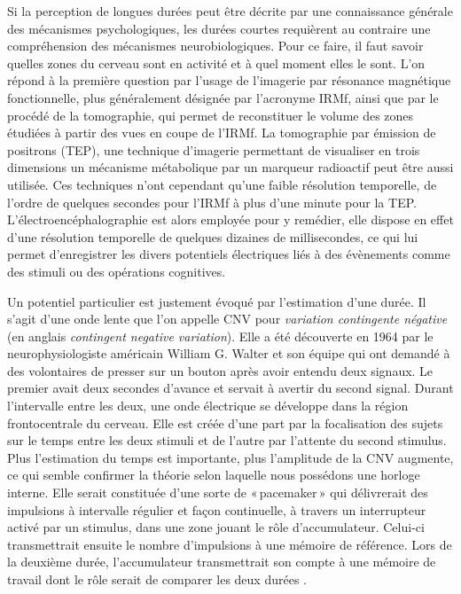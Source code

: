 \documentclass[12pt,fleqn,oneside,french,openany]{book} %
\begin{document}
Si la perception de longues durées peut être décrite par une connaissance générale des mécanismes psychologiques, les durées courtes requièrent au contraire une compréhension des mécanismes neurobiologiques. Pour ce faire, il faut savoir quelles zones du cerveau sont en activité et à quel moment elles le sont. L'on répond à la première question par l'usage de l'imagerie par résonance magnétique fonctionnelle, plus généralement désignée par l'acronyme IRMf, ainsi que par le procédé de la tomographie, qui permet de reconstituer le volume des zones étudiées à partir des vues en coupe de l'IRMf. La tomographie par émission de positrons (TEP), une technique d'imagerie permettant de visualiser en trois dimensions un mécanisme métabolique par un marqueur radioactif peut être aussi utilisée. Ces techniques n'ont cependant qu'une faible résolution temporelle, de l'ordre de quelques secondes pour l'IRMf à plus d'une minute pour la TEP. L'électroencéphalographie est alors employée pour y remédier, elle dispose en effet d'une résolution temporelle de quelques dizaines de millisecondes, ce qui lui permet d'enregistrer les divers potentiels électriques liés à des évènements comme des stimuli ou des opérations cognitives. 

\begin{figure}[h]
\end{figure}
Un potentiel particulier est justement évoqué par l'estimation d'une durée. Il s'agit d'une onde lente que l'on appelle CNV pour \emph{variation contingente négative} (en anglais \emph{contingent negative variation}). Elle a été découverte en 1964 par le neurophysiologiste américain William G. Walter et son équipe qui ont demandé à des volontaires de presser sur un bouton après avoir entendu deux signaux. Le premier avait deux secondes d'avance et servait à avertir du second signal. Durant l'intervalle entre les deux, une onde électrique se développe dans la région frontocentrale du cerveau. Elle est créée d'une part par la focalisation des sujets sur le temps entre les deux stimuli et de l'autre par l'attente du second stimulus. Plus l'estimation du temps est importante, plus l'amplitude de la CNV augmente, ce qui semble confirmer la théorie selon laquelle nous possédons une horloge interne. Elle serait constituée d'une sorte de «\,pacemaker\,» qui délivrerait des impulsions à intervalle régulier et façon continuelle, à travers un interrupteur activé par un stimulus, dans une zone jouant le rôle d'accumulateur. Celui-ci transmettrait ensuite le nombre d'impulsions à une mémoire de référence. Lors de la deuxième durée, l'accumulateur transmettrait son compte à une mémoire de travail dont le rôle serait de comparer les deux durées \cite{gibbon1984}.
\end{document}
